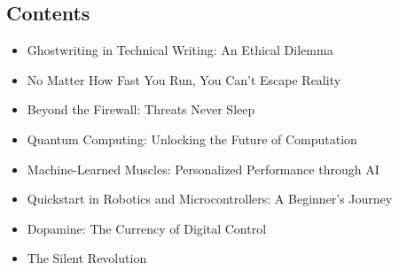 \documentclass[a4paper,10pt,twocolumn]{memoir}
\begin{document}
\begin{titlingpage}
\begin{minipage}[t]{0.45\textwidth}
\section*{\centering\large\bfseries\color{primary}Contents}
\vspace{0.5cm}
\vspace{0.5cm}

\begin{itemize}
\item Ghostwriting in Technical Writing: An Ethical Dilemma 
\item No Matter How Fast You Run, You Can’t Escape Reality 
\item Beyond the Firewall: Threats Never Sleep 
\item Quantum Computing: Unlocking the Future of Computation \dotfill 
\item Machine-Learned Muscles: Personalized Performance through AI 
\item Quickstart in Robotics and Microcontrollers: A Beginner’s Journey 
\item Dopamine: The Currency of Digital Control 
\item The Silent Revolution 

\end{itemize}

\end{minipage}
\end{titlingpage}
\clearpage


\end{document}
